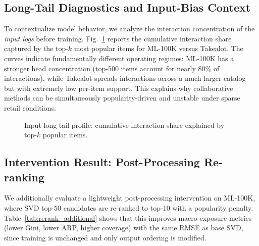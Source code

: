 \documentclass[conference]{IEEEtran}
\begin{document}
\subsection{Long-Tail Diagnostics and Input-Bias Context}

To contextualize model behavior, we analyze the interaction concentration of the \emph{input logs} before training. Fig.~\ref{fig:longtail_diag} reports the cumulative interaction share captured by the top-$k$ most popular items for ML-100K versus Takealot. The curves indicate fundamentally different operating regimes: ML-100K has a stronger head concentration (top-500 items account for nearly 80\% of interactions), while Takealot spreads interactions across a much larger catalog but with extremely low per-item support. This explains why collaborative methods can be simultaneously popularity-driven and unstable under sparse retail conditions.

\begin{figure}[!t]
  \centering
  \caption{Input long-tail profile: cumulative interaction share explained by top-$k$ popular items.}
  \label{fig:longtail_diag}
\end{figure}

\subsection{Intervention Result: Post-Processing Re-ranking}

We additionally evaluate a lightweight post-processing intervention on ML-100K, where SVD top-50 candidates are re-ranked to top-10 with a popularity penalty. Table~\ref{tab:rerank_additional} shows that this improves macro exposure metrics (lower Gini, lower ARP, higher coverage) with the same RMSE as base SVD, since training is unchanged and only output ordering is modified.
\end{document}
